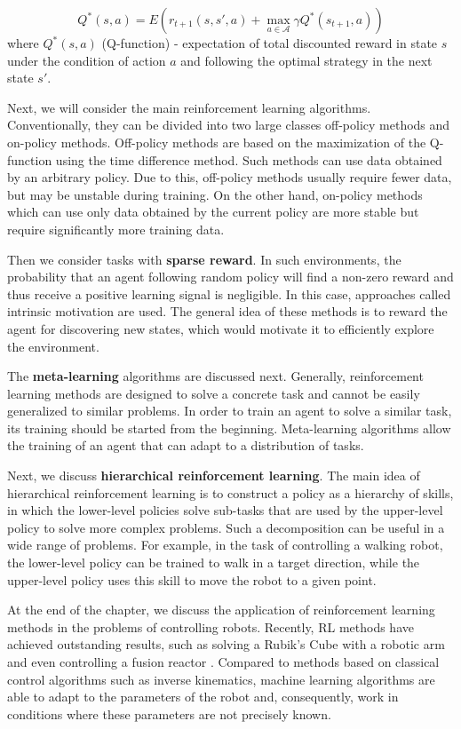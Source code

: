 \[
	Q^*(s, a) = E(r_{t + 1}(s, s', a) + \max_{a \in \mathcal{A}} \gamma Q^*(s_{t + 1}, a))
\]
where $Q^*(s, a)$ (Q-function) - expectation of total discounted reward in state $s$ under the condition of action $a$ and following the optimal strategy in the next state $s'$.

Next, we will consider the main reinforcement learning algorithms. Conventionally, they can be divided into two large classes off-policy methods and on-policy methods. Off-policy methods are based on the maximization of the Q-function using the time difference method. Such methods can use data obtained by an arbitrary policy. Due to this, off-policy methods usually require fewer data, but may be unstable during training. On the other hand, on-policy methods which can use only data obtained by the current policy are more stable but require significantly more training data. 

Then we consider tasks with \textbf{sparse reward}. In such environments, the probability that an agent following random policy will find a non-zero reward and thus receive a positive learning signal is negligible. In this case, approaches called intrinsic motivation are used. The general idea of these methods is to reward the agent for discovering new states, which would motivate it to efficiently explore the environment.

The \textbf{meta-learning} algorithms are discussed next. Generally, reinforcement learning methods are designed to solve a concrete task and cannot be easily generalized to similar problems. In order to train an agent to solve a similar task, its training should be started from the beginning. Meta-learning algorithms allow the training of an agent that can adapt to a distribution of tasks. 

Next, we discuss \textbf{hierarchical reinforcement learning}. The main idea of hierarchical reinforcement learning is to construct a policy as a hierarchy of skills, in which the lower-level policies solve sub-tasks that are used by the upper-level policy to solve more complex problems. Such a decomposition can be useful in a wide range of problems. For example, in the task of controlling a walking robot, the lower-level policy can be trained to walk in a target direction, while the upper-level policy uses this skill to move the robot to a given point.

At the end of the chapter, we discuss the application of reinforcement learning methods in the problems of controlling robots. Recently, RL methods have achieved outstanding results, such as solving a Rubik's Cube with a robotic arm \cite{rubic} and even controlling a fusion reactor \cite{tokomak}. Compared to methods based on classical control algorithms such as inverse kinematics, machine learning algorithms are able to adapt to the parameters of the robot and, consequently, work in conditions where these parameters are not precisely known.

